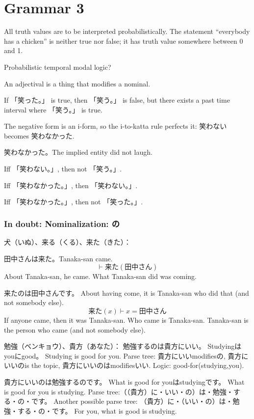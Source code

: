 \chapter{Grammar 3}

All truth values are to be interpreted probabilistically.
The statement ``everybody has a chicken'' is neither true nor false;
it has truth value somewhere between 0 and 1.

Probabilistic temporal modal logic?

An adjectival is a thing that modifies a nominal.

If 「笑った。」 is true, then 「笑う。」 is false,
but there exists a past time interval where 「笑う。」 is true.

The negative form is an i-form, so the i-to-katta rule perfects it:
笑わない becomes 笑わなかった.

笑わなかった。The implied entity did not laugh.

Iff 「笑わない。」, then not 「笑う。」.

Iff 「笑わなかった。」, then 「笑わない。」.

Iff 「笑わなかった。」, then not 「笑った。」.

\subsection{In doubt: Nominalization: の}

犬（いぬ）、来る（くる）、来た（きた）：

田中さんは来た。Tanaka-san came.
\[
    \vdash 来た(田中さん)
\]
About Tanaka-san, he came.
What Tanaka-san did was coming.

来たのは田中さんです。
About having come,
it is Tanaka-san who did that (and not somebody else).
\[
    来た(x) \vdash x = 田中さん
\]
If anyone came, then it was Tanaka-san.
Who came is Tanaka-san.
Tanaka-san is the person who came (and not somebody else).

勉強（ベンキョウ）、貴方（あなた）：
勉強するのは貴方にいい。
Studyingはyouにgood。
Studying is good for you.
Parse tree:
貴方にいいmodifiesの,
貴方にいいのis the topic,
貴方にいいのはmodifiesいい.
Logic: good-for(studying,you).

貴方にいいのは勉強するのです。
What is good for youはstudyingです。
What is good for you is studying.
Parse tree:（（貴方）に・いい・の）は・勉強・する・の・です。
Another possible parse tree:
（貴方）に・（いい・の）は・勉強・する・の・です。
For you, what is good is studying.

